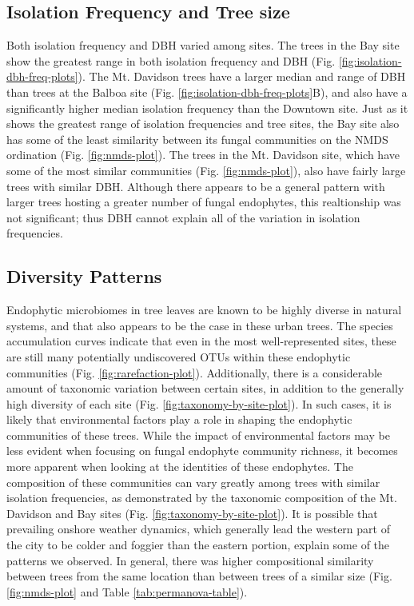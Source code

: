 \documentclass[fleqn,10pt,lineno]{wlpeerj} %
\begin{document}
\hypertarget{isolation-frequency-and-tree-size}{%
\subsection*{Isolation Frequency and Tree size}\label{isolation-frequency-and-tree-size}}

Both isolation frequency and DBH varied among sites. The trees in the Bay site show the greatest range in both isolation frequency and DBH (Fig. \ref{fig:isolation-dbh-freq-plots}). The Mt. Davidson trees have a larger median and range of DBH than trees at the Balboa site (Fig. \ref{fig:isolation-dbh-freq-plots}B), and also have a significantly higher median isolation frequency than the Downtown site. Just as it shows the greatest range of isolation frequencies and tree sites, the Bay site also has some of the least similarity between its fungal communities on the NMDS ordination (Fig. \ref{fig:nmds-plot}). The trees in the Mt. Davidson site, which have some of the most similar communities (Fig. \ref{fig:nmds-plot}), also have fairly large trees with similar DBH. Although there appears to be a general pattern with larger trees hosting a greater number of fungal endophytes, this realtionship was not significant; thus DBH cannot explain all of the variation in isolation frequencies.

\hypertarget{diversity-patterns-1}{%
\subsection*{Diversity Patterns}\label{diversity-patterns-1}}

Endophytic microbiomes in tree leaves are known to be highly diverse in natural systems, and that also appears to be the case in these urban trees. The species accumulation curves indicate that even in the most well-represented sites, these are still many potentially undiscovered OTUs within these endophytic communities (Fig. \ref{fig:rarefaction-plot}). Additionally, there is a considerable amount of taxonomic variation between certain sites, in addition to the generally high diversity of each site (Fig. \ref{fig:taxonomy-by-site-plot}). In such cases, it is likely that environmental factors play a role in shaping the endophytic communities of these trees. While the impact of environmental factors may be less evident when focusing on fungal endophyte community richness, it becomes more apparent when looking at the identities of these endophytes. The composition of these communities can vary greatly among trees with similar isolation frequencies, as demonstrated by the taxonomic composition of the Mt. Davidson and Bay sites (Fig. \ref{fig:taxonomy-by-site-plot}). It is possible that prevailing onshore weather dynamics, which generally lead the western part of the city to be colder and foggier than the eastern portion, explain some of the patterns we observed. In general, there was higher compositional similarity between trees from the same location than between trees of a similar size (Fig. \ref{fig:nmds-plot} and Table \ref{tab:permanova-table}).
\end{document}
